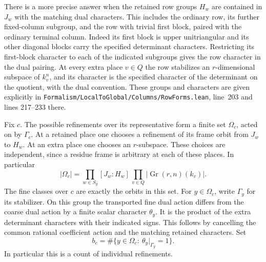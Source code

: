 \documentclass[a4paper,11pt]{article}
\theoremstyle{definition}
\theoremstyle{remark}
\newcommand{\srcloc}[2]{{\small\nolinkurl{#1.lean}}, line~#2}
\numberwithin{equation}{section}
\begin{document}
There is a more precise answer when the retained row groups
\(H_w\) are contained in \(J_w\) with the matching dual
characters. This includes the ordinary row, its further
fixed-column subgroup, and the row with trivial first block,
paired with the ordinary terminal column. Indeed its first
block is upper unitriangular and its other diagonal blocks
carry the specified determinant characters. Restricting its
first-block character to each of the indicated subgroups gives
the row character in the dual pairing. At every extra place
\(v\in Q\) the row stabilizes an \(r\)-dimensional subspace
of \(k_v^n\), and its character is the specified character of
the determinant on the quotient, with the dual convention.
These groups and characters are given explicitly in
\srcloc{Formalism/LocalToGlobal/Columns/RowForms}{203}
and lines 217--233 there.

Fix \(c\). The possible refinements over its representative form
a finite set \(\Omega_c\), acted on by \(\Gamma_c\). At a retained
place one chooses a refinement of its frame orbit from \(J_w\)
to \(H_w\). At an extra place one chooses an \(r\)-subspace.
These choices are independent, since a residue frame is arbitrary
at each of these places. In particular
\[
 |\Omega_c|=\prod_{w\in S_g}[J_w:H_w]\,
                \prod_{v\in Q}|\operatorname{Gr}(r,n)(k_v)|.
\]
The fine classes over \(c\) are exactly the orbits in this set.
For \(y\in\Omega_c\), write \(\Gamma_y\) for its stabilizer.
On this group the transported fine dual action differs from
the coarse dual action by a finite scalar character \(\theta_y\).
It is the product of the extra determinant characters with
their indicated signs. This follows by cancelling the common
rational coefficient action and the matching retained
characters. Set
\[
  b_c=\#\{y\in\Omega_c:\ \theta_y|_{\Gamma_y}=1\}.
\]
In particular this is a count of individual refinements.
\end{document}
